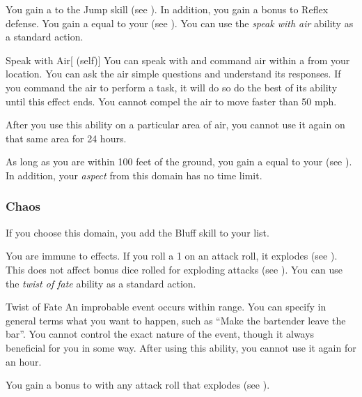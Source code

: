              You gain a   to the Jump skill (see ).
            In addition, you gain a  bonus to Reflex defense.
             You gain a  equal to your  (see ).
             You can use the \textit{speak with air} ability as a standard action.
            \begin{attuneability}{Speak with Air}[ (self)]
                You can speak with and command air within a \areahuge {} from your location.
                You can ask the air simple questions and understand its responses.
                If you command the air to perform a task, it will do so do the best of its ability until this effect ends.
                You cannot compel the air to move faster than 50 mph.

                After you use this ability on a particular area of air, you cannot use it again on that same area for 24 hours.
            \end{attuneability}
             As long as you are within 100 feet of the ground, you gain a  equal to your  (see ).
            In addition, your \textit{aspect} from this domain has no time limit.

        \subsubsection{Chaos}
            If you choose this domain, you add the Bluff skill to your  list.

             You are immune to  effects.
             If you roll a 1 on an attack roll, it explodes (see ).
            This does not affect bonus dice rolled for exploding attacks (see ).
             You can use the \textit{twist of fate} ability as a standard action.
            \begin{freeability}{Twist of Fate}
                An improbable event occurs within \rnglong range.
                You can specify in general terms what you want to happen, such as ``Make the bartender leave the bar''.
                You cannot control the exact nature of the event, though it always beneficial for you in some way.
                After using this ability, you cannot use it again for an hour.
            \end{freeability}
             You gain a  bonus to  with any attack roll that explodes (see ).

